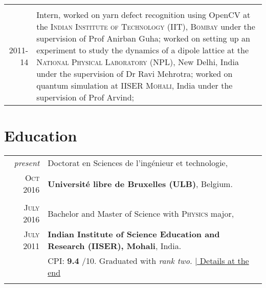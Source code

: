 \documentclass[a4paper,10pt]{article}
\begin{document}
\begin{tabular}{r|p{11cm}}
{{\multicolumn{2}{c}{} \\

\textsc{2011-14}  & Intern, {\footnotesize worked on yarn defect recognition using OpenCV at the} \textsc{Indian Institute of Technology (IIT), Bombay} 
                      {\footnotesize under the supervision of} \small{Prof Anirban Guha}; 
                      {\footnotesize worked on setting up an experiment to study the dynamics of a dipole lattice at the}
                      \textsc{National Physical Laboratory (NPL)}, New Delhi, India
                      {\footnotesize under the supervision of} \small{Dr Ravi Mehrotra};
                      {\footnotesize worked on quantum simulation at} \textsc{IISER Mohali}, India  
                      {\footnotesize under the supervision of} \small{Prof Arvind}; 
\end{tabular}

\section{Education}
\begin{tabular}{rp{11cm}}	
  \emph{present} & Doctorat en Sciences de l'ingénieur et technologie,\\
 \textsc{Oct} 2016  & \textbf{Université libre de Bruxelles (ULB)}, Belgium.\\
                    & \\
 \textsc{July} 2016 & Bachelor and Master of Science with \textsc{Physics} major,\\
 \textsc{July} 2011 & \textbf{Indian Institute of Science Education and Research (IISER), Mohali}, India.\\
& CPI: \textbf{9.4} /10. \small Graduated with \emph{rank two.} \hyperlink{grades}{\hfill | \footnotesize Details at the end}\\&\\ 
\end{tabular}

\end{document}
